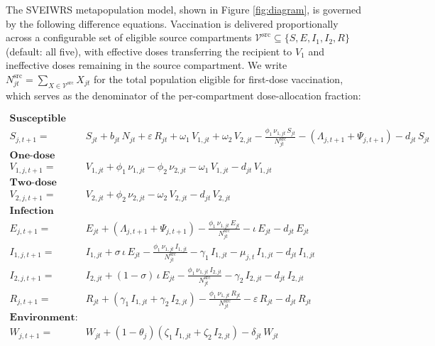 \documentclass[
]{book}
\begin{document}
The SVEIWRS metapopulation model, shown in Figure \ref{fig:diagram}, is governed by the following difference equations. Vaccination is delivered proportionally across a configurable set of eligible source compartments \(\mathcal{V}^{\text{src}} \subseteq \{S, E, I_1, I_2, R\}\) (default: all five), with effective doses transferring the recipient to \(V_1\) and ineffective doses remaining in the source compartment. We write \(N^{\text{src}}_{jt} = \sum_{X \in \mathcal{V}^{\text{src}}} X_{jt}\) for the total population eligible for first-dose vaccination, which serves as the denominator of the per-compartment dose-allocation fraction:

\begin{equation}
\begin{aligned}
\mathbf{\text{Susceptible population:}}\\[1mm]
S_{j,t+1} = \ &
S_{jt}
+ b_{jt}\,N_{jt}
+ \varepsilon\,R_{jt}
+ \omega_1\,V_{1,jt}
+ \omega_2\,V_{2,jt}
- \frac{\phi_1\,\nu_{1,jt}\,S_{jt}}{N^{\text{src}}_{jt}}
- \left( \Lambda_{j,t+1} + \Psi_{j,t+1} \right)
- d_{jt}\,S_{jt}\\[3mm]
\mathbf{\text{One-dose vaccination:}}\\[1mm]
V_{1,j,t+1} = \ &
V_{1,jt}
+ \phi_1\,\nu_{1,jt}
- \phi_2\,\nu_{2,jt}
- \omega_1\,V_{1,jt}
- d_{jt}\,V_{1,jt}\\[3mm]
\mathbf{\text{Two-dose vaccination:}}\\[1mm]
V_{2,j,t+1} = \ &
V_{2,jt}
+ \phi_2\,\nu_{2,jt}
- \omega_2\,V_{2,jt}
- d_{jt}\,V_{2,jt}\\[3mm]
\mathbf{\text{Infection dynamics:}}\\[1mm]
E_{j,t+1} = \ &
E_{jt}
+ \left( \Lambda_{j,t+1} + \Psi_{j,t+1}\right)
- \frac{\phi_1\,\nu_{1,jt}\,E_{jt}}{N^{\text{src}}_{jt}}
- \iota\,E_{jt}
- d_{jt}\,E_{jt}\\[3mm]
I_{1,j,t+1} = \ &
I_{1,jt}
+ \sigma\,\iota\,E_{jt}
- \frac{\phi_1\,\nu_{1,jt}\,I_{1,jt}}{N^{\text{src}}_{jt}}
- \gamma_1\,I_{1,jt}
- \mu_{j,t}\,I_{1,jt}
- d_{jt}\,I_{1,jt}\\[3mm]
I_{2,j,t+1} = \ &
I_{2,jt}
+ \left(1-\sigma\right)\,\iota\,E_{jt}
- \frac{\phi_1\,\nu_{1,jt}\,I_{2,jt}}{N^{\text{src}}_{jt}}
- \gamma_2\,I_{2,jt}
- d_{jt}\,I_{2,jt}\\[3mm]
R_{j,t+1} = \ &
R_{jt}
+ \left( \gamma_1\,I_{1,jt} + \gamma_2\,I_{2,jt} \right)
- \frac{\phi_1\,\nu_{1,jt}\,R_{jt}}{N^{\text{src}}_{jt}}
- \varepsilon\,R_{jt}
- d_{jt}\,R_{jt}\\[5mm]
\mathbf{\text{Environment:}}\\[1mm]
W_{j,t+1} = \ &
W_{jt}
+ \left(1-\theta_j\right)\left( \zeta_1\,I_{1,jt} + \zeta_2\,I_{2,jt} \right)
- \delta_{jt}\,W_{jt}\\[3mm]
\end{aligned}
\label{eq:system}
\end{equation}
\end{document}
